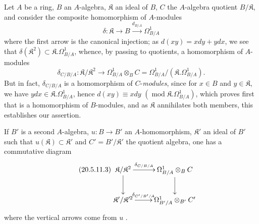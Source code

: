 \begin{env}[20.5.11]
\label{0.20.5.11}
Let $A$ be a ring, $B$ an $A$-algebra, $\mathfrak{K}$ an ideal of $B$, $C$ the $A$-algebra quotient $B/\mathfrak{K}$, and consider the composite homomorphism of $A$-modules
\begin{equation}
\tag{20.5.11.1}
  \label{0.20.5.11.1}
  \delta:\mathfrak{K}\to B\xrightarrow{d_{B/A}}\Omega^1_{B/A}
\end{equation}
where the first arrow is the canonical injection; as $d(xy)=xdy+ydx$, we see that $\delta(\mathfrak{K}^2)\subset\mathfrak{K}.\Omega^1_{B/A}$, whence, by passing to quotients, a homomorphism of $A$-modules
\begin{equation}
\tag{20.5.11.2}
  \label{0.20.5.11.2}
  \delta_{C/B/A}:\mathfrak{K}/\mathfrak{K}^2\to\Omega^1_{B/A}\otimes_B C=\Omega^1_{B/A}/(\mathfrak{K}.\Omega^1_{B/A}).
\end{equation}
But in fact, $\delta_{C/B/A}$ is a homomorphism of $C$-\emph{modules}, since for $x\in B$ and $y\in\mathfrak{K}$, we have $ydx\in\mathfrak{K}.\Omega^1_{B/A}$, hence $d(xy)\equiv xdy$ $(\operatorname{mod}\mathfrak{K}.\Omega^1_{B/A})$, which proves first that  is a homomorphism of $B$-modules, and as $\mathfrak{K}$ annihilates both members, this establishes our assertion.

If $B'$ is a second $A$-algebra, $u:B\to B'$ an $A$-homomorphism, $\mathfrak{K}'$ an ideal of $B'$ such that $u(\mathfrak{K})\subset\mathfrak{K}'$ and $C'=B'/\mathfrak{K}'$ the quotient algebra, one has a commutative diagram
\begin{equation}
\tag{20.5.11.3}
  \label{0.20.5.11.3}
\xymatrix{
  \mathfrak{K}/\mathfrak{K}^2 \ar[r]^-{\delta_{C/B/A}} \ar[d] & \Omega^1_{B/A}\otimes_B C \ar[d] \\
  \mathfrak{K}'/\mathfrak{K}'^2 \ar[r]^-{\delta_{C'/B'/A}} & \Omega^1_{B'/A}\otimes_{B'} C'
}
\end{equation}
where the vertical arrows come from $u$ .
\end{env}

